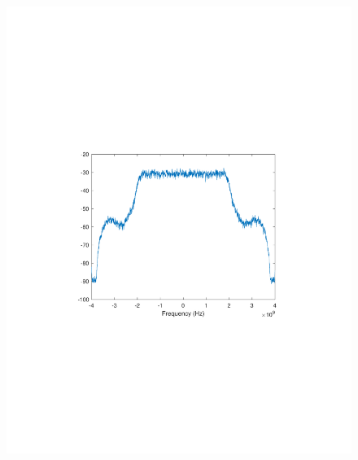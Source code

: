 \begin{refsection}
\begin{figure}[H]
	\centering
	\begin{minipage}{0.30\textwidth}
		\centering
		\includegraphics[clip, trim=4cm 8cm 4cm 8cm, width=1\textwidth]{./sdf/m_qam_system/figures/expResults/homodyne/3_4GBdInSig13dB_AfMIMO1.pdf}
		\label{fig:4GBdEyeMIMO1}
	\end{minipage}
	\begin{minipage}{0.30\textwidth}
		\centering

\end{minipage}
\end{figure}
\end{refsection}
